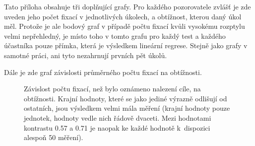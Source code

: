 

Tato příloha obsahuje tři doplňující grafy. Pro každého pozorovatele zvlášť je
zde uveden jeho počet fixací v jednotlivých úkolech, a obtížnost, kterou daný
úkol měl. Protože je ale bodový graf v případě počtu
fixací kvůli vysokému rozptylu velmi nepřehledný, je místo toho v tomto grafu
pro každý test a každého účastníka pouze přímka, která je výsledkem lineární regrese. Stejně jako grafy v samotné práci, ani tyto nezahrnují prvních pět úkolů. 

Dále je zde graf závislosti průměrného počtu fixací na obtížnosti.

\def\graphfigure#1#2#3{
\begin{figure}[h!]
\centering
\caption{#2}
\label{#3}
\end{figure}
}

\graphfigure{Kontrast_fix}{Závislost počtu fixací, než bylo oznámeno nalezení
cíle, na obtížnosti. Krajní hodnoty, které se jako jediné výrazně odlišují od
ostatních, jsou výsledkem velmi mála měření (krajní hodnoty pouze
jednotek, hodnoty vedle nich řádově dvaceti. Mezi hodnotami kontrastu 0.57 a
0.71 je naopak ke každé hodnotě k~dispozici alespoň 50 měření). }{kontr}

